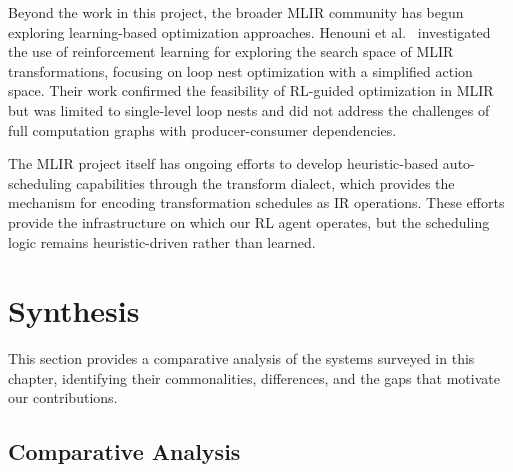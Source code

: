Beyond the work in this project, the broader MLIR community has begun exploring learning-based optimization approaches. Henouni et al.~\cite{henouni2022utilisation} investigated the use of reinforcement learning for exploring the search space of MLIR transformations, focusing on loop nest optimization with a simplified action space. Their work confirmed the feasibility of RL-guided optimization in MLIR but was limited to single-level loop nests and did not address the challenges of full computation graphs with producer-consumer dependencies.

The MLIR project itself has ongoing efforts to develop heuristic-based auto-scheduling capabilities through the transform dialect, which provides the mechanism for encoding transformation schedules as IR operations. These efforts provide the infrastructure on which our RL agent operates, but the scheduling logic remains heuristic-driven rather than learned.

\section{Synthesis}

This section provides a comparative analysis of the systems surveyed in this chapter, identifying their commonalities, differences, and the gaps that motivate our contributions.

\subsection{Comparative Analysis}

